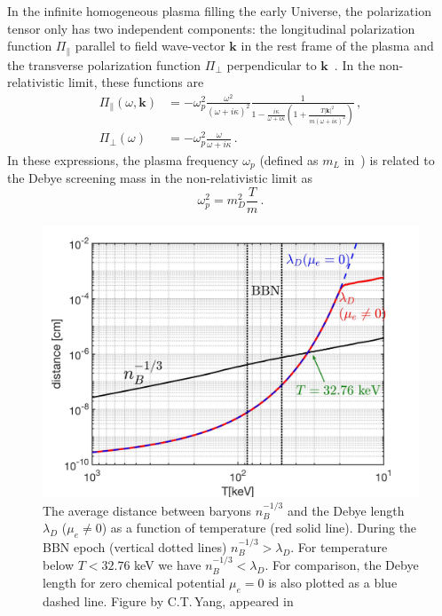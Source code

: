 In the infinite homogeneous plasma filling the early Universe, the polarization tensor only has two independent components: the longitudinal polarization function $\Pi_{\parallel}$ parallel to field wave-vector $\boldsymbol{k}$ in the rest frame of the plasma and the transverse polarization function $\Pi_{\perp}$ perpendicular to $\boldsymbol{k}$~\cite{melrose2008quantum}. In the non-relativistic limit, these functions are~\cite{Formanek:2021blc}
\begin{align}\label{eq:polfuncs}
	\Pi_\parallel(\omega,\boldsymbol{k}) &= -\omega_p^2\frac{\omega^2}{(\omega+ i \kappa)^2} \frac{1}{1-\frac{i\kappa}{\omega+ i \kappa}\left(1+\frac{ T |\boldsymbol{k}|^2}{m (\omega+ i \kappa)^2} \right)}\,,\\
	\Pi_{\perp}(\omega) &= -\omega_p^2 \frac{\omega}{\omega+ i \kappa}\,.
\end{align}
In these expressions, the plasma frequency $\omega_p$ (defined as $m_L$ in~\cite{Formanek:2021blc}) is related to the Debye screening mass in the non-relativistic limit as
\begin{equation}\label{eq:plasmafreq}
 \omega_p^2 = m_D^2\frac{T}{m}\,.
\end{equation}

\begin{figure} 
\centerline{\includegraphics[width=0.90\linewidth]{plots/chap03BBN/Distance_Plasma002.jpg}}
\caption{ The average distance between baryons $n_B^{-1/3}$ and the Debye length $\lambda_D$ ($\mu_e \neq 0$) as a function of temperature (red solid line). During the BBN epoch (vertical dotted lines) $n_B^{-1/3}>\lambda_D$. For temperature below $T<32.76$ keV we have $n_B^{-1/3}<\lambda_D$. For comparison, the Debye length for zero chemical potential $\mu_e=0$ is also plotted as a blue dashed line. Figure by C.T.\,Yang, appeared in~\cite{Grayson:2023flr}}
\label{MeanFreePath_fig} 
\end{figure}


